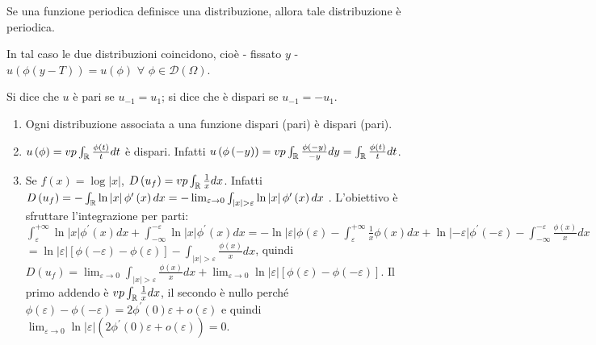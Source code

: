 \documentclass{article}
\begin{document}
Se una funzione periodica definisce una distribuzione, allora tale
distribuzione \`{e} periodica.

In tal caso le due distribuzioni coincidono, cio\`{e} - fissato $y$ - $%
u\left( \phi \left( y-T\right) \right) =u\left( \phi \right) $ $\forall $ $%
\phi \in \mathcal{D}\left( \Omega \right) $.

Si dice che $u$ \`{e} pari se $u_{-1}=u_{1}$; si dice che \`{e} dispari se $%
u_{-1}=-u_{1}$.

\begin{enumerate}
\item Ogni distribuzione associata a una funzione dispari (pari) \`{e}
dispari (pari).

\item $u\left( \phi \right) =vp\int_{%
\mathbb{R}
}\frac{\phi \left( t\right) }{t}dt$ \`{e} dispari. Infatti $u\left( \phi
\left( -y\right) \right) =vp\int_{%
\mathbb{R}
}\frac{\phi \left( -y\right) }{-y}dy=\int_{%
\mathbb{R}
}\frac{\phi \left( t\right) }{t}dt$.

\item Se $f\left( x\right) =\log \left\vert x\right\vert $, $D\left(
u_{f}\right) =vp\int_{%
\mathbb{R}
}\frac{1}{x}dx$. Infatti $D\left( u_{f}\right) =-\int_{%
\mathbb{R}
}\ln \left\vert x\right\vert \phi ^{\prime }\left( x\right)
dx=-\lim_{\varepsilon \rightarrow 0}\int_{\left\vert x\right\vert
>\varepsilon }\ln \left\vert x\right\vert \phi ^{\prime }\left( x\right) dx$%
. L'obiettivo \`{e} sfruttare l'integrazione per parti: $\int_{\varepsilon
}^{+\infty }\ln \left\vert x\right\vert \phi ^{\prime }\left( x\right)
dx+\int_{-\infty }^{-\varepsilon }\ln \left\vert x\right\vert \phi ^{\prime
}\left( x\right) dx=-\ln \left\vert \varepsilon \right\vert \phi \left(
\varepsilon \right) -\int_{\varepsilon }^{+\infty }\frac{1}{x}\phi \left(
x\right) dx+\ln \left\vert -\varepsilon \right\vert \phi ^{\prime }\left(
-\varepsilon \right) -\int_{-\infty }^{-\varepsilon }\frac{\phi \left(
x\right) }{x}dx$ $=\ln \left\vert \varepsilon \right\vert \left[ \phi \left(
-\varepsilon \right) -\phi \left( \varepsilon \right) \right]
-\int_{\left\vert x\right\vert >\varepsilon }\frac{\phi \left( x\right) }{x}%
dx$, quindi $D\left( u_{f}\right) =\lim_{\varepsilon \rightarrow
0}\int_{\left\vert x\right\vert >\varepsilon }\frac{\phi \left( x\right) }{x}%
dx+\lim_{\varepsilon \rightarrow 0}\ln \left\vert \varepsilon \right\vert %
\left[ \phi \left( \varepsilon \right) -\phi \left( -\varepsilon \right) %
\right] $. Il primo addendo \`{e} $vp\int_{%
\mathbb{R}
}\frac{1}{x}dx$, il secondo \`{e} nullo perch\'{e} $\phi \left( \varepsilon
\right) -\phi \left( -\varepsilon \right) =2\phi ^{\prime }\left( 0\right)
\varepsilon +o\left( \varepsilon \right) $ e quindi $\lim_{\varepsilon
\rightarrow 0}\ln \left\vert \varepsilon \right\vert \left( 2\phi ^{\prime
}\left( 0\right) \varepsilon +o\left( \varepsilon \right) \right) =0$.


\end{enumerate}
\end{document}
